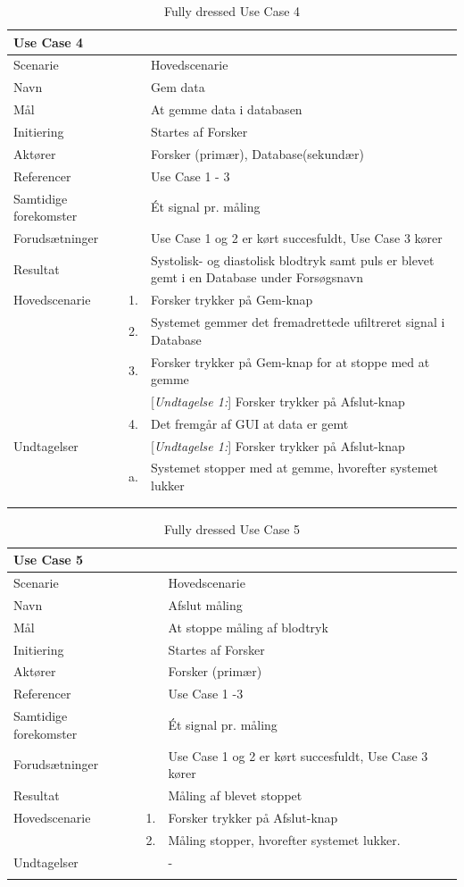 \begin{longtabu} to  %
    {\large \textbf{Use Case 4}} && \\
    \toprule
    Scenarie && Hovedscenarie\\
    Navn && Gem data\\
    Mål && At gemme data i databasen\\
    Initiering && Startes af Forsker\\
    Aktører && Forsker (primær), Database(sekundær)\\
    Referencer && Use Case 1 - 3 \\
    Samtidige forekomster  &&  Ét signal pr. måling\\
    Forudsætninger && Use Case 1 og 2 er kørt succesfuldt, Use Case 3 kører\\
    Resultat && Systolisk- og diastolisk blodtryk samt puls er blevet gemt i en Database under Forsøgsnavn\\ \midrule
    Hovedscenarie &    1. &		Forsker trykker på Gem-knap\\[-1ex] 
    &	2. & Systemet gemmer det fremadrettede ufiltreret signal i Database\\
                  &    3. &  Forsker trykker på Gem-knap for at stoppe med at gemme\\
    &	&			[\textit{Undtagelse 1:}] Forsker trykker på Afslut-knap\\
                    &    4. &   Det fremgår af GUI at data er gemt\\ \midrule	 	
 Undtagelser &    & [\textit{Undtagelse 1:}] Forsker trykker på Afslut-knap\\
 & a. 	&  Systemet stopper med at gemme, hvorefter systemet lukker\\  

 \\ \bottomrule
\caption{Fully dressed Use Case 4}
\label{UC4}
\end{longtabu}
\newpage
\begin{longtabu} to  %
	{\large \textbf{Use Case 5}} && \\
	\toprule
	Scenarie && Hovedscenarie\\
	Navn && Afslut måling \\
	Mål && At stoppe måling af blodtryk\\
	Initiering && Startes af Forsker\\
	Aktører && Forsker (primær)\\
	Referencer && Use Case 1 -3  \\
	Samtidige forekomster  &&  Ét signal pr. måling\\
	Forudsætninger && Use Case 1 og 2 er kørt succesfuldt, Use Case 3 kører\\
	Resultat && Måling af blevet stoppet\\ \midrule
	Hovedscenarie &    1. &		Forsker trykker på Afslut-knap\\[-1ex] 
	&    2. &   Måling stopper, hvorefter systemet lukker. \\ \midrule	 	
	Undtagelser &    & - 	\\ \bottomrule
	\caption{Fully dressed Use Case 5}
	\label{UC5}
\end{longtabu}

